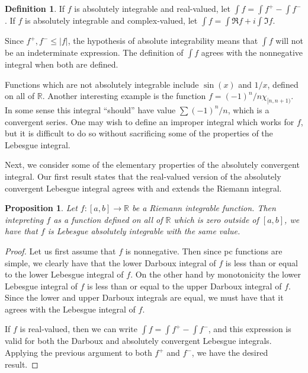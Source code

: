 \documentclass[10pt,oneside]{amsbook}
\newcommand{\RR}{{\mathbb R}}
\theoremstyle{definition}
\theoremstyle{plain}
\newtheorem{prop}[thm]{Proposition}
\theoremstyle{definition}
\newtheorem{defn}[thm]{Definition}
\theoremstyle{remark}
\numberwithin{equation}{section}
\numberwithin{figure}{section}
\begin{document}
\begin{defn}
  If $f$ is absolutely integrable and real-valued, let $\int f=\int f^+-\int f^-$. If $f$ is absolutely integrable and complex-valued, let $\int f=\int\Re f+i\int\Im f$.
\end{defn}

Since $f^+,f^-\leq|f|$, the hypothesis of absolute integrability means that $\int f$ will not be an indeterminate expression. The definition of $\int f$ agrees with the nonnegative integral when both are defined.

Functions which are not absolutely integrable include $\sin(x)$ and $1/x$, defined on all of $\RR$. Another interesting example is the function $f=(-1)^n/n\chi_{[n,n+1)}$. In some sense this integral ``should'' have value $\sum(-1)^n/n$, which is a convergent series. One may wish to define an improper integral which works for $f$, but it is difficult to do so without sacrificing some of the properties of the Lebesgue integral.

Next, we consider some of the elementary properties of the absolutely convergent integral. Our first result states that the real-valued version of the absolutely convergent Lebesgue integral agrees with and extends the Riemann integral.



\begin{prop}
  Let $f\colon[a,b]\to\RR$ be a Riemann integrable function. Then intepreting $f$ as a function defined on all of $\RR$ which is zero outside of $[a,b]$, we have that $f$ is Lebesgue absolutely integrable with the same value.
\end{prop}

\begin{proof}
  Let us first assume that $f$ is nonnegative. Then since pc functions are simple, we clearly have that the lower Darboux integral of $f$ is less than or equal to the lower Lebesgue integral of $f$. On the other hand by monotonicity the lower Lebesgue integral of $f$ is less than or equal to the upper Darboux integral of $f$. Since the lower and upper Darboux integrals are equal, we must have that it agrees with the Lebesgue integral of $f$.

  If $f$ is real-valued, then we can write $\int f=\int f^+-\int f^-$, and this expression is valid for both the Darboux and absolutely convergent Lebesgue integrals. Applying the previous argument to both $f^+$ and $f^-$, we have the desired result.
\end{proof}
\end{document}
